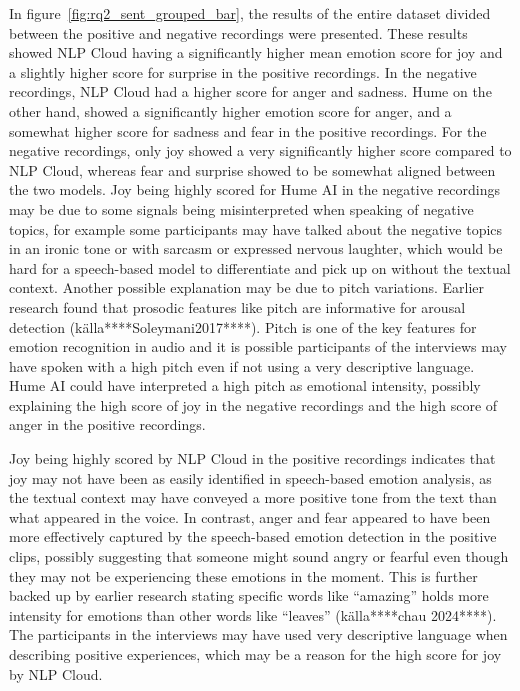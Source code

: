 In figure~\ref{fig:rq2_sent_grouped_bar}, the results of the entire dataset divided between the positive and negative recordings were presented. These results showed NLP Cloud having a significantly higher mean emotion score for joy and a slightly higher score for surprise in the positive recordings. In the negative recordings, NLP Cloud had a higher score for anger and sadness. Hume on the other hand, showed a significantly higher emotion score for anger, and a somewhat higher score for sadness and fear in the positive recordings. For the negative recordings, only joy showed a very significantly higher score compared to NLP Cloud, whereas fear and surprise showed to be somewhat aligned between the two models. Joy being highly scored for Hume AI in the negative recordings may be due to some signals being misinterpreted when speaking of negative topics, for example some participants may have talked about the negative topics in an ironic tone or with sarcasm or expressed nervous laughter, which would be hard for a speech-based model to differentiate and pick up on without the textual context.
Another possible explanation may be due to pitch variations. Earlier research found that prosodic features like pitch are informative for arousal detection (källa****Soleymani2017****). Pitch is one of the key features for emotion recognition in audio and it is possible participants of the interviews may have spoken with a high pitch even if not using a very descriptive language. Hume AI could have interpreted a high pitch as emotional intensity, possibly explaining the high score of joy in the negative recordings and the high score of anger in the positive recordings.

Joy being highly scored by NLP Cloud in the positive recordings indicates that joy may not have been as easily identified in speech-based emotion analysis, as the textual context may have conveyed a more positive tone from the text than what appeared in the voice. In contrast, anger and fear appeared to have been more effectively captured by the speech-based emotion detection in the positive clips, possibly suggesting that someone might sound angry or fearful even though they may not be experiencing these emotions in the moment. This is further backed up by earlier research stating specific words like “amazing” holds more intensity for emotions than other words like “leaves” (källa****chau 2024****). The participants in the interviews may have used very descriptive language when describing positive experiences, which may be a reason for the high score for joy by NLP Cloud.


